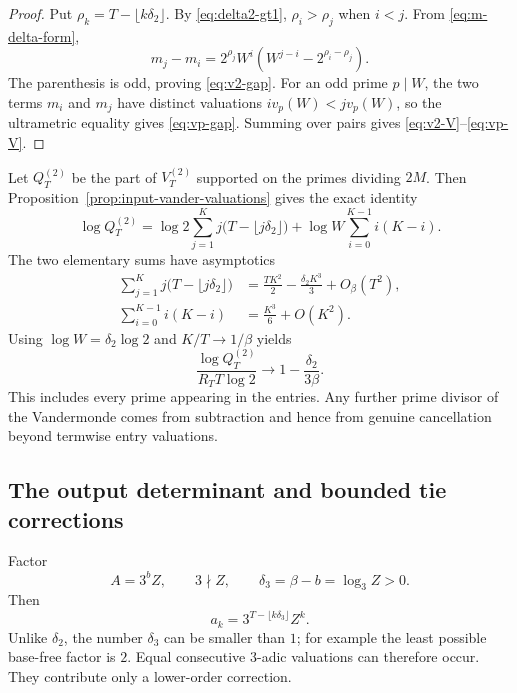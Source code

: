 \documentclass[11pt,oneside]{article}
\theoremstyle{definition}
\theoremstyle{remark}
\begin{document}
\begin{proof}
Put $\rho_k=T-\lfloor k\delta_2\rfloor$.  By
\eqref{eq:delta2-gt1}, $\rho_i>\rho_j$ when $i<j$.  From
\eqref{eq:m-delta-form},
\[
 m_j-m_i
 =2^{\rho_j}W^i\left(W^{j-i}-2^{\rho_i-\rho_j}\right).
\]
The parenthesis is odd, proving \eqref{eq:v2-gap}.  For an odd prime $p\mid W$, the two terms
$m_i$ and $m_j$ have distinct valuations $i v_p(W)<jv_p(W)$, so the ultrametric equality gives
\eqref{eq:vp-gap}.  Summing over pairs gives \eqref{eq:v2-V}--\eqref{eq:vp-V}.
\end{proof}

Let $Q_T^{(2)}$ be the part of $V_T^{(2)}$ supported on the primes dividing $2M$.  Then
Proposition~\ref{prop:input-vander-valuations} gives the exact identity
\begin{equation}\label{eq:logQm-exact}
 \log Q_T^{(2)}
 =\log2\sum_{j=1}^Kj\bigl(T-\lfloor j\delta_2\rfloor\bigr)
  +\log W\sum_{i=0}^{K-1}i(K-i).
\end{equation}
The two elementary sums have asymptotics
\begin{align*}
 \sum_{j=1}^Kj\bigl(T-\lfloor j\delta_2\rfloor\bigr)
 &=\frac{TK^2}{2}-\frac{\delta_2K^3}{3}+O_\beta(T^2),\\
 \sum_{i=0}^{K-1}i(K-i)&=\frac{K^3}{6}+O(K^2).
\end{align*}
Using $\log W=\delta_2\log2$ and $K/T\to1/\beta$ yields
\begin{equation}\label{eq:Qm-ratio}
 \frac{\log Q_T^{(2)}}{R_TT\log2}
 \longrightarrow
 1-\frac{\delta_2}{3\beta}.
\end{equation}
This includes every prime appearing in the entries.  Any further prime divisor of the
Vandermonde comes from subtraction and hence from genuine cancellation beyond termwise
entry valuations.

\subsection{The output determinant and bounded tie corrections}

Factor
\[
  A=3^bZ,
  \qquad 3\nmid Z,
  \qquad
  \delta_3=\beta-b=\log_3Z>0.
\]
Then
\begin{equation}\label{eq:a-delta-form}
  a_k=3^{T-\lfloor k\delta_3\rfloor}Z^k.
\end{equation}
Unlike $\delta_2$, the number $\delta_3$ can be smaller than $1$; for example the least
possible base-free factor is $2$.  Equal consecutive $3$-adic valuations can therefore occur.
They contribute only a lower-order correction.
\end{document}
